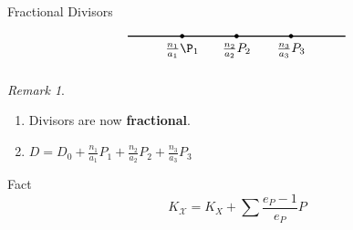 \documentclass{beamer}
\theoremstyle{remark}
\newtheorem{rem}[thm]{Remark}
\newcommand \sx{{\mathscr X}}
\begin{document}
\begin{frame}{Fractional Divisors}

\begin{equation} \label{pic:M-curve} \notag
  \begin{tikzpicture}
    \draw[thick] (-3,0) -- (3,0);
		
		
		\filldraw[draw=black,fill=black] (-1.5,0) node [below=2pt]{$\frac{n_1}{a_1}\P_1$} circle (1.5pt);
		\filldraw[draw=black,fill=black] (0,0) node [below=2pt] {$\frac{n_2}{a_2}P_2$} circle (1.5pt);
		\filldraw[draw=black,fill=black] (1.5,0) node [below=2pt] {$\frac{n_3}{a_3}P_3$} circle (1.5pt);
		
  \end{tikzpicture}
\end{equation}

\begin{rem}
  \begin{enumerate}
  \item Divisors are now \textbf{fractional}.
  \item $D = D_0 + \frac{n_{1}}{a_1}P_1 + \frac{n_{2}}{a_2}P_2 + \frac{n_{3}}{a_3}P_{3}$
  \end{enumerate}

\end{rem}

\begin{block}{Fact}
\[
	K_{\sx} = K_X + \sum \frac{e_P-1}{e_P} P
\]
\end{block}

\end{frame}

\end{document}
